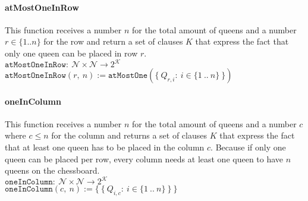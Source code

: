 \paragraph{atMostOneInRow}
This function receives a number $n$ for the total amount of queens and a number $r \in \{1 .. n\}$ for the row and return a set of clauses $K$ that express the fact that only one queen can be placed in row $r$.
\\[0.2cm]
\hspace*{1.3cm} $\texttt{atMostOneInRow}:\ \mathcal{N} \times \mathcal{N} \to 2^{\mathcal{K}}$
\\[0.2cm]
\hspace*{1.3cm} $\texttt{atMostOneInRow}(r,\ n) := \texttt{atMostOne}(\{\ Q_{r,i} :\ i \in \{1\ ..\ n\}\ \})$

\paragraph{oneInColumn}
This function receives a number $n$ for the total amount of queens and a number $c$ where $c \leq n$ for the column and returns a set of clauses $K$ that express the fact that at least one queen has to be placed in the column $c$. Because if only one queen can be placed per row, every column needs at least one queen to have $n$ queens on the chessboard.
\\[0.2cm]
\hspace*{1.3cm} $\texttt{oneInColumn}:\ \mathcal{N} \times \mathcal{N} \to 2^{\mathcal{K}}$
\\[0.2cm]
\hspace*{1.3cm} $\texttt{oneInColumn}(c,\ n) := \bigl\{\ \{\ Q_{i,c} :\ i \in \{1\ ..\ n\}\ \}\ \bigr\}$

